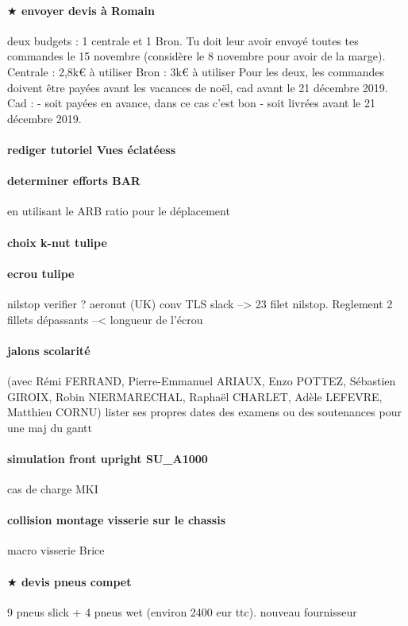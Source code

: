 \paragraph{$\bigstar$ envoyer devis à Romain} deux budgets : 1 centrale et 1 Bron. Tu doit leur avoir envoyé toutes tes commandes le 15 novembre (considère le 8 novembre pour avoir de la marge).
Centrale : 2,8k€ à utiliser
Bron : 3k€ à utiliser
Pour les deux, les commandes doivent être payées avant les vacances de noël, cad avant le 21 décembre 2019.
Cad :
- soit payées en avance, dans ce cas c'est bon
- soit livrées avant le 21 décembre 2019.
\paragraph{rediger tutoriel Vues éclatéess} 
\paragraph{determiner efforts BAR} en utilisant le ARB ratio pour le déplacement
\paragraph{choix k-nut tulipe} 
\paragraph{ecrou tulipe} nilstop verifier ? aeronut (UK) conv TLS slack --> 23 filet nilstop. Reglement 2 fillets dépassants --< longueur de l'écrou
\paragraph{jalons scolarité} (avec Rémi FERRAND, Pierre-Emmanuel ARIAUX, Enzo POTTEZ, Sébastien GIROIX, Robin NIERMARECHAL, Raphaël CHARLET, Adèle LEFEVRE, Matthieu CORNU) lister ses propres dates des examens ou des soutenances pour une maj du gantt
\paragraph{simulation front upright SU\_A1000} cas de charge MKI
\paragraph{collision montage visserie sur le chassis} macro visserie Brice
\paragraph{$\bigstar$ devis pneus compet} 9 pneus slick + 4 pneus wet (environ 2400 eur ttc). nouveau fournisseur
